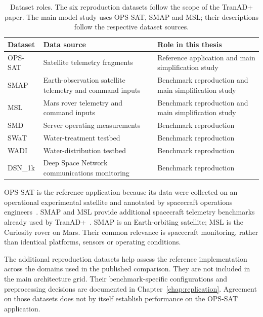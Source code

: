 \begin{table}[htbp]
  \centering
  \small
  \begin{tabularx}{\textwidth}{@{}lXX@{}}
    \toprule
    Dataset & Data source & Role in this thesis \\
    \midrule
    \acs{OPS-SAT} & Satellite telemetry fragments & Reference application and main simplification study \\
    \acs{SMAP} & Earth-observation satellite telemetry and command inputs & Benchmark reproduction and main simplification study \\
    \acs{MSL} & Mars rover telemetry and command inputs & Benchmark reproduction and main simplification study \\
    \acs{SMD} & Server operating measurements & Benchmark reproduction \\
    SWaT & Water-treatment testbed & Benchmark reproduction \\
    WADI & Water-distribution testbed & Benchmark reproduction \\
    DSN\_1k & Deep Space Network communications monitoring & Benchmark reproduction \\
    \bottomrule
  \end{tabularx}
  \caption{Dataset roles. The six reproduction datasets follow the scope of
  the TranAD+ paper. The main model study uses \acs{OPS-SAT}, \acs{SMAP} and
  \acs{MSL}; their descriptions follow the respective dataset sources.}
  \label{tab:datasets-roles}
\end{table}

\ac{OPS-SAT} is the reference application because its data were collected
on an operational experimental satellite and annotated by spacecraft
operations engineers~\cite{Ruszczak2025OPSSAT}. \ac{SMAP} and \ac{MSL}
provide additional spacecraft telemetry benchmarks already used by
TranAD+~\cite{Hundman2018Spacecraft,Yermakov2025TranADPlus}. \ac{SMAP} is an
Earth-orbiting satellite; \ac{MSL} is the Curiosity rover on Mars. Their common
relevance is spacecraft monitoring, rather than identical platforms,
sensors or operating conditions.

The additional reproduction datasets help assess the reference implementation
across the domains used in the published comparison. They are not included
in the main architecture grid. Their benchmark-specific configurations and
preprocessing decisions are documented in Chapter~\ref{chap:replication}.
Agreement on those datasets does not by
itself establish performance on the \ac{OPS-SAT} application.

